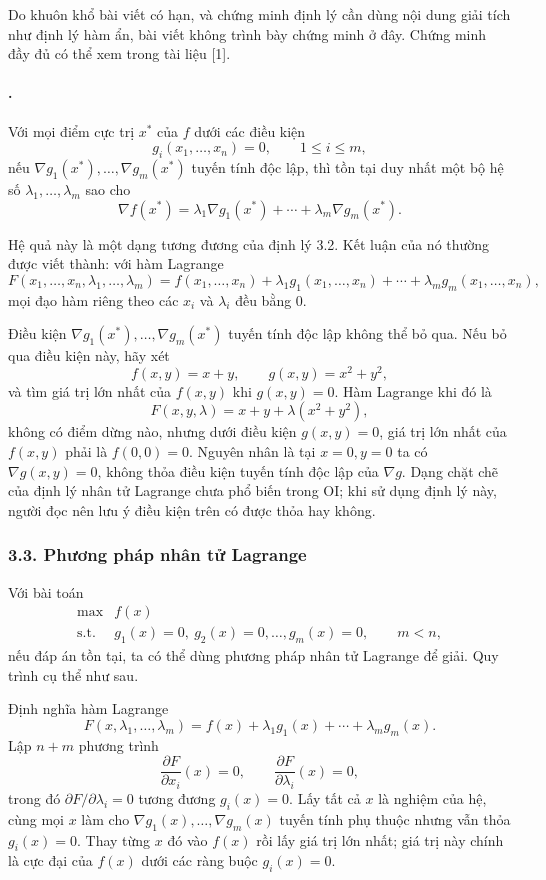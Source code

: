 \documentclass[11pt]{article}
\begin{document}
Do khuôn khổ bài viết có hạn, và chứng minh định lý cần dùng nội dung giải
tích như định lý hàm ẩn, bài viết không trình bày chứng minh ở đây. Chứng minh
đầy đủ có thể xem trong tài liệu [1].

\paragraph{.}
Với mọi điểm cực trị \(x^\ast\) của \(f\) dưới các điều kiện
\[
  g_i(x_1,\ldots,x_n)=0,\qquad 1\le i\le m,
\]
nếu \(\nabla g_1(x^\ast),\ldots,\nabla g_m(x^\ast)\) tuyến tính độc lập, thì
tồn tại duy nhất một bộ hệ số \(\lambda_1,\ldots,\lambda_m\) sao cho
\[
  \nabla f(x^\ast)=
  \lambda_1\nabla g_1(x^\ast)+\cdots+\lambda_m\nabla g_m(x^\ast).
\]

Hệ quả này là một dạng tương đương của định lý 3.2. Kết luận của nó thường được
viết thành: với hàm Lagrange
\[
  F(x_1,\ldots,x_n,\lambda_1,\ldots,\lambda_m)
  =f(x_1,\ldots,x_n)+\lambda_1g_1(x_1,\ldots,x_n)+\cdots+
   \lambda_mg_m(x_1,\ldots,x_n),
\]
mọi đạo hàm riêng theo các \(x_i\) và \(\lambda_i\) đều bằng \(0\).

Điều kiện \(\nabla g_1(x^\ast),\ldots,\nabla g_m(x^\ast)\) tuyến tính độc lập
không thể bỏ qua. Nếu bỏ qua điều kiện này, hãy xét
\[
  f(x,y)=x+y,\qquad g(x,y)=x^2+y^2,
\]
và tìm giá trị lớn nhất của \(f(x,y)\) khi \(g(x,y)=0\). Hàm Lagrange khi đó là
\[
  F(x,y,\lambda)=x+y+\lambda(x^2+y^2),
\]
không có điểm dừng nào, nhưng dưới điều kiện \(g(x,y)=0\), giá trị lớn nhất của
\(f(x,y)\) phải là \(f(0,0)=0\). Nguyên nhân là tại \(x=0,y=0\) ta có
\(\nabla g(x,y)=0\), không thỏa điều kiện tuyến tính độc lập của \(\nabla g\).
Dạng chặt chẽ của định lý nhân tử Lagrange chưa phổ biến trong OI; khi sử dụng
định lý này, người đọc nên lưu ý điều kiện trên có được thỏa hay không.

\subsubsection*{3.3. Phương pháp nhân tử Lagrange}

Với bài toán
\[
\begin{array}{ll}
  \max & f(x)\\
  \text{s.t.} & g_1(x)=0,\ g_2(x)=0,\ldots,g_m(x)=0,\qquad m<n,
\end{array}
\]
nếu đáp án tồn tại, ta có thể dùng phương pháp nhân tử Lagrange để giải. Quy
trình cụ thể như sau.

Định nghĩa hàm Lagrange
\[
  F(x,\lambda_1,\ldots,\lambda_m)
  =f(x)+\lambda_1g_1(x)+\cdots+\lambda_mg_m(x).
\]
Lập \(n+m\) phương trình
\[
  \frac{\partial F}{\partial x_i}(x)=0,\qquad
  \frac{\partial F}{\partial \lambda_i}(x)=0,
\]
trong đó \(\partial F/\partial\lambda_i=0\) tương đương \(g_i(x)=0\). Lấy tất
cả \(x\) là nghiệm của hệ, cùng mọi \(x\) làm cho
\(\nabla g_1(x),\ldots,\nabla g_m(x)\) tuyến tính phụ thuộc nhưng vẫn thỏa
\(g_i(x)=0\). Thay từng \(x\) đó vào \(f(x)\) rồi lấy giá trị lớn nhất; giá trị
này chính là cực đại của \(f(x)\) dưới các ràng buộc \(g_i(x)=0\).
\end{document}
